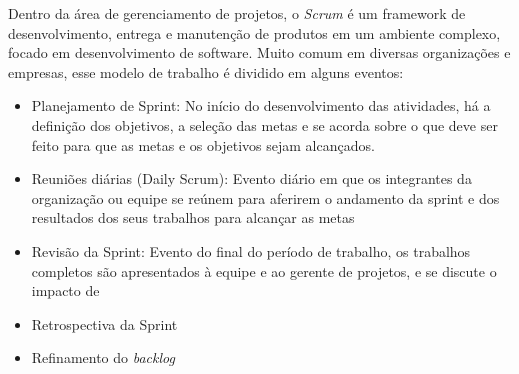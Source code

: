 Dentro da área de gerenciamento de projetos, o \textit{Scrum} é um framework de desenvolvimento, entrega e manutenção de produtos em um ambiente complexo, focado em desenvolvimento de software. Muito comum em diversas organizações e empresas, esse modelo de trabalho é dividido em alguns eventos:

\begin{itemize}
    \item Planejamento de Sprint: No início do desenvolvimento das atividades, há a definição dos objetivos, a seleção das metas e se acorda sobre o que deve ser feito para que as metas e os objetivos sejam alcançados.
    \item Reuniões diárias (Daily Scrum): Evento diário em que os integrantes da organização ou equipe se reúnem para aferirem o andamento da sprint e dos resultados dos seus trabalhos para alcançar as metas
    \item Revisão da Sprint: Evento do final do período de trabalho, os trabalhos completos são apresentados à  equipe e ao gerente de projetos, e se discute o impacto de
    \item Retrospectiva da Sprint
    \item Refinamento do \textit{backlog}
\end{itemize}

